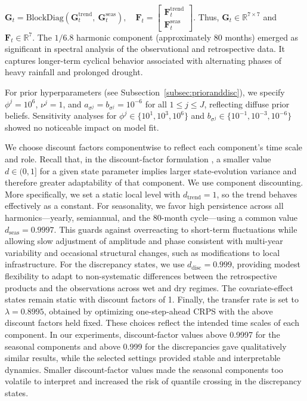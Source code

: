 \documentclass[APA,STIX1COL]{WileyNJD-v2}
\begin{document}
\(
\mathbf{G}_t = \text{BlockDiag}\left(\mathbf{G}^{\text{trend}}_t,\ \mathbf{G}^{\text{seas}}_t\right),\quad
\mathbf{F}_t = 
\begin{bmatrix}
\mathbf{F}^{\text{trend}}_t \\[5pt]
\mathbf{F}^{\text{seas}}_t
\end{bmatrix}.
\) Thus, \(\mathbf{G}_t \in \mathbb{R}^{7\times7}\) and \(\mathbf{F}_t \in \mathbb{R}^{7}\). The \(1/6.8\) harmonic component (approximately 80 months) emerged as significant in spectral analysis of the observational and retrospective data. It captures longer-term cyclical behavior associated with alternating phases of heavy rainfall and prolonged drought.

For prior hyperparameters (see Subsection~\ref{subsec:prioranddisc}), we specify \(\phi^j = 10^6\), \(\nu^j = 1\), and \(a_{\sigma^j} = b_{\sigma^j} = 10^{-6}\) for all \(1 \leq j \leq J\), reflecting diffuse prior beliefs. Sensitivity analyses for \(\phi^j \in \{10^1, 10^3, 10^6\}\) and \(b_{\sigma^j} \in \{10^{-1}, 10^{-3}, 10^{-6}\}\) showed no noticeable impact on model fit.

We choose discount factors componentwise to reflect each component’s time scale and role. Recall that, in the discount-factor formulation \citep{prado2021time}, a smaller value \(d \in (0,1]\) for a given state parameter implies larger state-evolution variance and therefore greater adaptability of that component. We use component discounting. More specifically, we set a static local level with \(d_{\text{trend}}=1\), so the trend behaves effectively as a constant. For seasonality, we favor high persistence across all harmonics---yearly, semiannual, and the 80-month cycle---using a common value \(d_{\text{seas}}=0.9997\). This guards against overreacting to short-term fluctuations while allowing slow adjustment of amplitude and phase consistent with multi-year variability and occasional structural changes, such as modifications to local infrastructure. For the discrepancy states, we use \(d_{\text{disc}}=0.999\), providing modest flexibility to adapt to non-systematic differences between the retrospective products and the observations across wet and dry regimes. The covariate-effect states remain static with discount factors of 1. Finally, the transfer rate is set to \(\lambda=0.8995\), obtained by optimizing one-step-ahead CRPS with the above discount factors held fixed. These choices reflect the intended time scales of each component. In our experiments, discount-factor values above 0.9997 for the seasonal components and above 0.999 for the discrepancies gave qualitatively similar results, while the selected settings provided stable and interpretable dynamics. Smaller discount-factor values made the seasonal components too volatile to interpret and increased the risk of quantile crossing in the discrepancy states.
\end{document}
